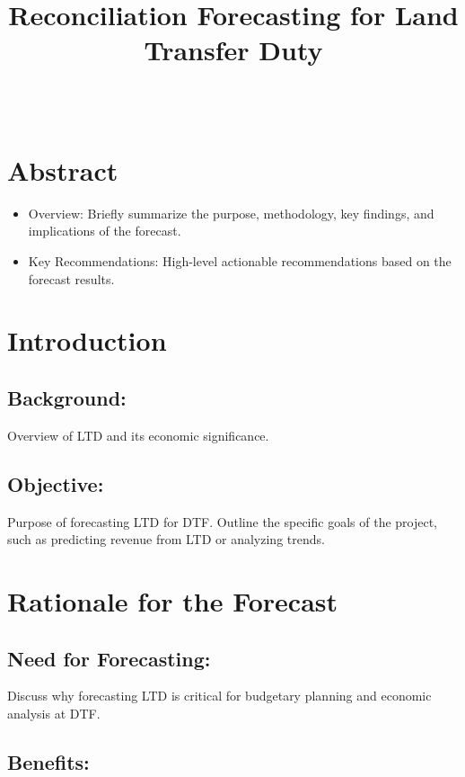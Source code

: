 \documentclass[11pt,a4paper,]{article}
\title{Reconciliation Forecasting for Land Transfer Duty}
\author{\sf{\Large\textbf{Hoang Do}\\\large Nobel Prize, PhD\\[0.5cm]}}
\date{\sf\Date~\Month~\Year}
\makeatletter
\providecommand{\tightlist}{%
  \setlength{\itemsep}{0pt}\setlength{\parskip}{0pt}}
\def\titlepage{\front{\expandafter{\@title}}{\@author}{\@organization}}
\makeatother
\begin{document}
\titlepage

{
\setcounter{tocdepth}{2}
\tableofcontents
}
\section{Abstract}\label{abstract}

\begin{itemize}
\tightlist
\item
  Overview: Briefly summarize the purpose, methodology, key findings, and implications of the forecast.
\item
  Key Recommendations: High-level actionable recommendations based on the forecast results.
\end{itemize}

\section{Introduction}\label{introduction}

\subsection{Background:}\label{background}

Overview of LTD and its economic significance.

\subsection{Objective:}\label{objective}

Purpose of forecasting LTD for DTF. Outline the specific goals of the project, such as predicting revenue from LTD or analyzing trends.

\section{Rationale for the Forecast}\label{rationale-for-the-forecast}

\subsection{Need for Forecasting:}\label{need-for-forecasting}

Discuss why forecasting LTD is critical for budgetary planning and economic analysis at DTF.

\subsection{Benefits:}\label{benefits}
\end{document}
